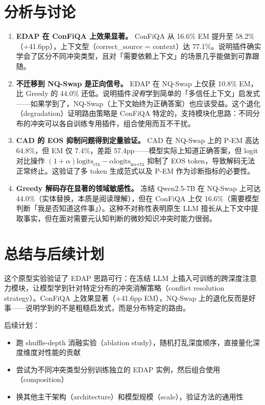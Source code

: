 \documentclass[11pt,a4paper]{ctexart}
\begin{document}
\section{分析与讨论}

\begin{enumerate}
    \item \textbf{EDAP 在 ConFiQA 上效果显著。} ConFiQA 从 16.6\% EM 提升至 58.2\%（+41.6pp），上下文型（correct\_source = context）达 77.1\%。说明插件确实学会了区分不同冲突类型，且对「需要依赖上下文」的场景几乎能做到可靠跟随。

    \item \textbf{不迁移到 NQ-Swap 是正向信号。} EDAP 在 NQ-Swap 上仅获 10.8\% EM，比 Greedy 的 44.0\% 还低。说明插件\textit{没有}学到简单的「多信任上下文」启发式——如果学到了，NQ-Swap（上下文始终为正确答案）也应该受益。这个退化（degradation）证明路由策略是 ConFiQA 特定的，支持模块化思路：不同分布的冲突可以各自训练专用插件，组合使用而互不干扰。

    \item \textbf{CAD 的 EOS 抑制问题得到定量验证。} CAD 在 NQ-Swap 上的 P-EM 高达 64.8\%，但 EM 仅 7.4\%，差距 57.4pp——模型实际上知道正确答案，但 logit 对比操作 $(1+\alpha)\text{logits}_{\text{ctx}} - \alpha\text{logits}_{\text{no-ctx}}$ 抑制了 EOS token，导致解码无法正常终止。这验证了多 token 生成范式以及 P-EM 作为诊断指标的必要性。

    \item \textbf{Greedy 解码存在显著的领域敏感性。} 冻结 Qwen2.5-7B 在 NQ-Swap 上可达 44.0\%（实体替换，本质是阅读理解），但在 ConFiQA 上仅 16.6\%（需要模型判断「我是否知道这件事」）。这种不对称性表明原生 LLM 擅长从上下文中提取事实，但在面对需要元认知判断的微妙知识冲突时能力很弱。
\end{enumerate}

\section{总结与后续计划}

这个原型实验验证了 EDAP 思路可行：在冻结 LLM 上插入可训练的跨深度注意力模块，让模型学到针对特定分布的冲突消解策略（conflict resolution strategy）。ConFiQA 上效果显著（+41.6pp EM），NQ-Swap 上的退化反而是好事——说明学到的不是粗糙启发式，而是分布特定的路由。

后续计划：
\begin{itemize}
    \item 跑 shuffle-depth 消融实验（ablation study），随机打乱深度顺序，直接量化深度维度对性能的贡献
    \item 尝试为不同冲突类型分别训练独立的 EDAP 实例，然后组合使用（composition）
    \item 换其他主干架构（architecture）和模型规模（scale），验证方法的通用性
\end{itemize}
\end{document}
